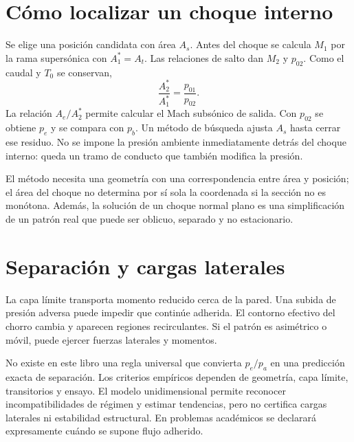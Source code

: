 \section{Cómo localizar un choque interno}
Se elige una posición candidata con área $A_s$. Antes del choque se calcula $M_1$ por la rama supersónica con $A^*_1=A_t$. Las relaciones de salto dan $M_2$ y $p_{02}$. Como el caudal y $T_0$ se conservan,
\[
 \frac{A^*_2}{A^*_1}=\frac{p_{01}}{p_{02}}.
\]
La relación $A_e/A^*_2$ permite calcular el Mach subsónico de salida. Con $p_{02}$ se obtiene $p_e$ y se compara con $p_b$. Un método de búsqueda ajusta $A_s$ hasta cerrar ese residuo. No se impone la presión ambiente inmediatamente detrás del choque interno: queda un tramo de conducto que también modifica la presión.

El método necesita una geometría con una correspondencia entre área y posición; el área del choque no determina por sí sola la coordenada si la sección no es monótona. Además, la solución de un choque normal plano es una simplificación de un patrón real que puede ser oblicuo, separado y no estacionario.
\section{Separación y cargas laterales}
La capa límite transporta momento reducido cerca de la pared. Una subida de presión adversa puede impedir que continúe adherida. El contorno efectivo del chorro cambia y aparecen regiones recirculantes. Si el patrón es asimétrico o móvil, puede ejercer fuerzas laterales y momentos.

No existe en este libro una regla universal que convierta $p_e/p_a$ en una predicción exacta de separación. Los criterios empíricos dependen de geometría, capa límite, transitorios y ensayo. El modelo unidimensional permite reconocer incompatibilidades de régimen y estimar tendencias, pero no certifica cargas laterales ni estabilidad estructural. En problemas académicos se declarará expresamente cuándo se supone flujo adherido.
